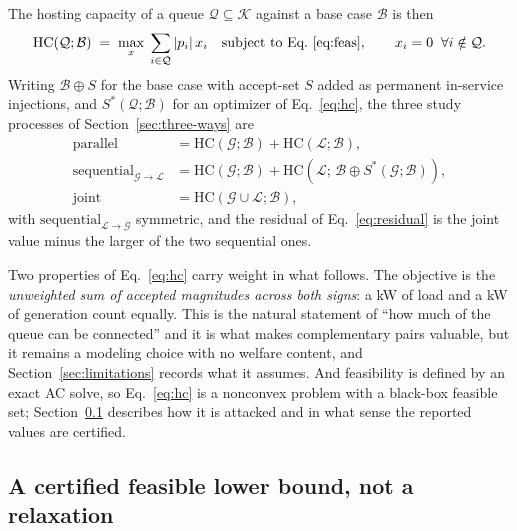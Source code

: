 \documentclass[review,authoryear,12pt]{elsarticle}
\begin{document}
The hosting capacity of a queue $\mathcal{Q} \subseteq \mathcal{K}$ against a
base case $\mathcal{B}$ is then
\begin{equation}
\mathrm{HC}(\mathcal{Q}; \mathcal{B}) \;=\; \max_{x}\;
\sum_{i \in \mathcal{Q}} |p_i|\, x_i
\quad \text{subject to Eq.~\eqref{eq:feas}},
\qquad x_i = 0 \;\; \forall i \notin \mathcal{Q}.
\label{eq:hc}
\end{equation}
Writing $\mathcal{B} \oplus S$ for the base case with accept-set $S$ added as
permanent in-service injections, and $S^\ast(\mathcal{Q};\mathcal{B})$ for an
optimizer of Eq.~\eqref{eq:hc}, the three study processes of
Section~\ref{sec:three-ways} are
\begin{align}
\text{parallel} &= \mathrm{HC}(\mathcal{G};\mathcal{B}) + \mathrm{HC}(\mathcal{L};\mathcal{B}), \label{eq:par}\\
\text{sequential}_{\mathcal{G}\to\mathcal{L}} &= \mathrm{HC}(\mathcal{G};\mathcal{B}) + \mathrm{HC}\!\left(\mathcal{L};\, \mathcal{B} \oplus S^\ast(\mathcal{G};\mathcal{B})\right), \label{eq:seq}\\
\text{joint} &= \mathrm{HC}(\mathcal{G} \cup \mathcal{L};\mathcal{B}), \label{eq:joint}
\end{align}
with $\text{sequential}_{\mathcal{L}\to\mathcal{G}}$ symmetric, and the
residual of Eq.~\eqref{eq:residual} is the joint value minus the larger of the
two sequential ones.

Two properties of Eq.~\eqref{eq:hc} carry weight in what follows.
The objective is the \emph{unweighted sum of accepted magnitudes across both
signs}: a kW of load and a kW of generation count equally. This is the natural
statement of ``how much of the queue can be connected'' and it is what makes
complementary pairs valuable, but it remains a modeling choice with no welfare
content, and Section~\ref{sec:limitations} records what it assumes. And
feasibility is defined by an exact AC solve, so Eq.~\eqref{eq:hc} is a
nonconvex problem with a black-box feasible set; Section~\ref{sec:instrument}
describes how it is attacked and in what sense the reported values are certified.

\subsection{A certified feasible lower bound, not a relaxation}
\label{sec:instrument}
\end{document}
